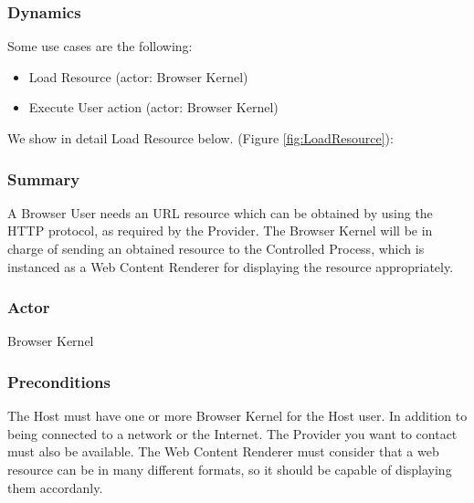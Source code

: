 \documentclass{sig-alternate-05-2015}
\begin{document}
    \subsubsection*{Dynamics}
    Some use cases are the following:
    \begin{itemize}
      \item Load Resource (actor: Browser Kernel)

      \item Execute User action (actor: Browser Kernel)

    \end{itemize}
    We show in detail Load Resource below. (Figure \ref{fig:LoadResource}):
    \subsubsection*{Summary} A Browser User needs an URL resource which can be obtained by using the HTTP protocol, as required by the Provider. The Browser Kernel will be in charge of sending an obtained resource to the Controlled Process, which is instanced as a Web Content Renderer for displaying the resource appropriately.
    \subsubsection*{Actor} Browser Kernel
    \subsubsection*{Preconditions} The Host must have one or more Browser Kernel for the Host user. In addition to being connected to a network or the Internet. The Provider you want to contact must also be available. The Web Content Renderer must consider that a web resource can be in many different formats, so it should be capable of displaying them accordanly.
\end{document}
